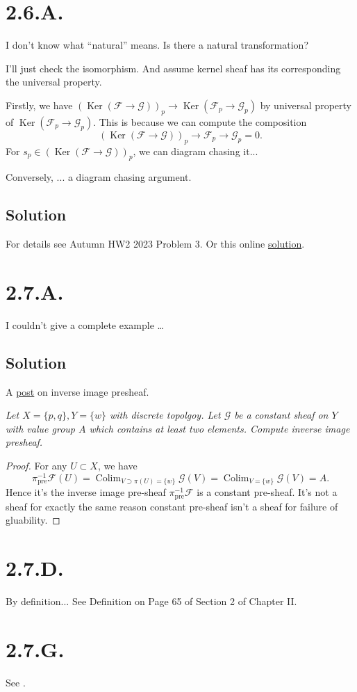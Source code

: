 \section{2.6.A.}\label{2.6.A.}

I don't know what \enquote{natural} means. Is there a natural transformation? 

I'll just check the isomorphism. And assume kernel sheaf has its corresponding the universal property.

Firstly, we have $(\operatorname{Ker}(\mathcal F\to\mathcal G))_p\to \operatorname{Ker}(\mathcal F_p\to\mathcal G_p)$ by universal property of $\operatorname{Ker}(\mathcal F_p\to\mathcal G_p)$. This is because we can compute the composition 
\[(\operatorname{Ker}(\mathcal F\to\mathcal G))_p\to \mathcal F_p\to\mathcal G_p=0.\] For $s_p\in(\operatorname{Ker}(\mathcal F\to\mathcal G))_p$, we can diagram chasing it... 

Conversely, ... a diagram chasing argument. 

\subsection{Solution}

For details see Autumn HW2 2023 Problem 3. Or this online \href{https://www.math.utah.edu/~zwick/Classes/Hartshorne/Section2_1.pdf}{solution}.

\section{2.7.A.}

I couldn't give a complete example \dots

\subsection{Solution}

A \href{https://math.stackexchange.com/questions/439769/inverse-image-presheaf}{post} on inverse image presheaf.

\textit{Let $X=\{p,q\}, Y=\{w\}$ with discrete topolgoy. Let $\mathscr G$ be a constant sheaf on $Y$ with value group $A$ which contains at least two elements. Compute inverse image presheaf.}
\begin{proof}
	For any $U\subset X$, we have 
	\[\pi_{\text{pre}}^{-1}\mathscr F(U)=\operatorname{Colim}_{V\supset \pi(U)=\{w\}}\mathscr G(V)=\operatorname{Colim}_{V=\{w\}}\mathscr G(V)=A.\]
	Hence it's the inverse image pre-sheaf $\pi_{\text{pre}}^{-1}\mathscr F$ is a constant pre-sheaf. It's not a sheaf for exactly the same reason constant pre-sheaf isn't a sheaf for failure of gluability.
\end{proof}

\section{2.7.D.}\label{2.7.D.}

By definition... See \cite{hartshorne2013algebraic} Definition on Page 65 of Section 2 of Chapter II.

\section{2.7.G.}

See .